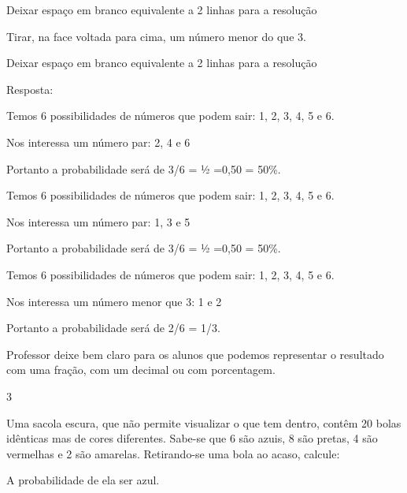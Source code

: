 \begin{escolha}
Deixar espaço em branco equivalente a 2 linhas para a resolução

\begin{escolha}

\item
  Tirar, na face voltada para cima, um número menor do que 3.
\end{escolha}

Deixar espaço em branco equivalente a 2 linhas para a resolução

Resposta:

\begin{escolha}

\item
  Temos 6 possibilidades de números que podem sair: 1, 2, 3, 4, 5 e 6.
\end{escolha}

Nos interessa um número par: 2, 4 e 6

Portanto a probabilidade será de 3/6 = ½ =0,50 = 50\%.

\begin{escolha}

\item
  Temos 6 possibilidades de números que podem sair: 1, 2, 3, 4, 5 e 6.
\end{escolha}

Nos interessa um número par: 1, 3 e 5

Portanto a probabilidade será de 3/6 = ½ =0,50 = 50\%.

\begin{escolha}

\item
  Temos 6 possibilidades de números que podem sair: 1, 2, 3, 4, 5 e 6.
\end{escolha}

Nos interessa um número menor que 3: 1 e 2

Portanto a probabilidade será de 2/6 = 1/3.

Professor deixe bem claro para os alunos que podemos representar o
resultado com uma fração, com um decimal ou com porcentagem.

\num{3}

Uma sacola escura, que não permite visualizar o que tem dentro, contêm
20 bolas idênticas mas de cores diferentes. Sabe-se que 6 são azuis, 8
são pretas, 4 são vermelhas e 2 são amarelas. Retirando-se uma bola ao
acaso, calcule:

\begin{escolha}

\item
  A probabilidade de ela ser azul.


\end{escolha}
\end{escolha}
